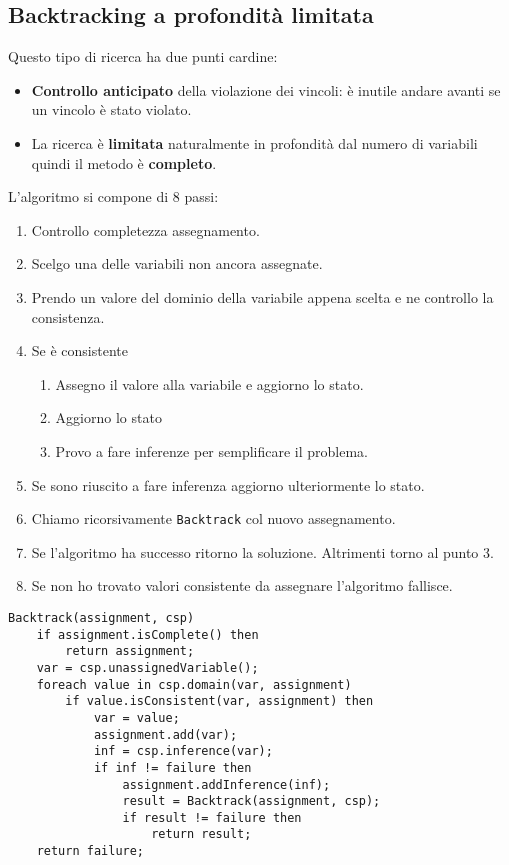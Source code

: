 \subsection{Backtracking a profondit\`a limitata}
Questo tipo di ricerca ha due punti cardine:
\begin{itemize}
	\item \textbf{Controllo anticipato} della violazione dei vincoli: \`e inutile andare avanti se un vincolo \`e
	      stato violato.
	\item La ricerca \`e \textbf{limitata} naturalmente in profondit\`a dal numero di variabili quindi il metodo
	      \`e \textbf{completo}.
\end{itemize}
L'algoritmo si compone di 8 passi:
\begin{enumerate}
	\item Controllo completezza assegnamento.
	\item Scelgo una delle variabili non ancora assegnate.
	\item Prendo un valore del dominio della variabile appena scelta e ne controllo la consistenza.
	\item Se \`e consistente
	      \begin{enumerate}
		      \item Assegno il valore alla variabile e aggiorno lo stato.
		      \item Aggiorno lo stato
		      \item Provo a fare inferenze per semplificare il problema.
	      \end{enumerate}
	\item Se sono riuscito a fare inferenza aggiorno ulteriormente lo stato.
	\item Chiamo ricorsivamente \verb|Backtrack| col nuovo assegnamento.
	\item Se l'algoritmo ha successo ritorno la soluzione. Altrimenti torno al punto 3.
	\item Se non ho trovato valori consistente da assegnare l'algoritmo fallisce.
\end{enumerate}
\begin{lstlisting}[style=pseudo-style]
Backtrack(assignment, csp)
	if assignment.isComplete() then
		return assignment;
	var = csp.unassignedVariable();
	foreach value in csp.domain(var, assignment)
		if value.isConsistent(var, assignment) then
			var = value;
			assignment.add(var);
			inf = csp.inference(var);
			if inf != failure then
				assignment.addInference(inf);
				result = Backtrack(assignment, csp);
				if result != failure then
					return result;
	return failure;
\end{lstlisting}

